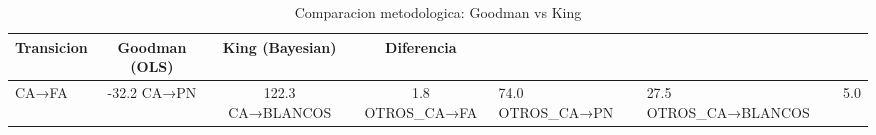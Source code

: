 \begin{table}
\caption{Comparacion metodologica: Goodman vs King}
\label{tab:goodman_vs_king}
\begin{tabular}{lccc}
\toprule
Transicion & Goodman (OLS) & King (Bayesian) & Diferencia \\
\midrule
CA→FA & -32.2%
CA→PN & 122.3%
CA→BLANCOS & 1.8%
OTROS_CA→FA & 74.0%
OTROS_CA→PN & 27.5%
OTROS_CA→BLANCOS & 5.0%
\bottomrule
\end{tabular}
\end{table}
